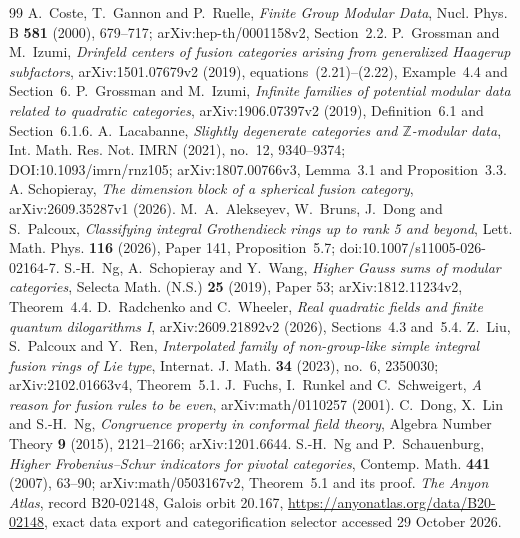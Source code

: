 \documentclass[11pt,reqno]{amsart}
\theoremstyle{definition}
\theoremstyle{remark}
\begin{document}
\begin{thebibliography}{99}
 A.~Coste, T.~Gannon and P.~Ruelle, \emph{Finite Group Modular Data}, Nucl. Phys. B \textbf{581} (2000), 679--717; arXiv:hep-th/0001158v2, Section~2.2.
 P.~Grossman and M.~Izumi, \emph{Drinfeld centers of fusion categories arising from generalized Haagerup subfactors}, arXiv:1501.07679v2 (2019), equations~(2.21)--(2.22), Example~4.4 and Section~6.
 P.~Grossman and M.~Izumi, \emph{Infinite families of potential modular data related to quadratic categories}, arXiv:1906.07397v2 (2019), Definition~6.1 and Section~6.1.6.
 A.~Lacabanne,
\emph{Slightly degenerate categories and $\mathbb Z$-modular data},
Int. Math. Res. Not. IMRN (2021), no.~12, 9340--9374;
DOI:10.1093/imrn/rnz105; arXiv:1807.00766v3, Lemma~3.1 and Proposition~3.3.
 A. Schopieray, \emph{The dimension block of a spherical fusion category}, arXiv:2609.35287v1 (2026).
 M.~A.~Alekseyev, W.~Bruns, J.~Dong and S.~Palcoux, \emph{Classifying integral Grothendieck rings up to rank 5 and beyond}, Lett. Math. Phys. \textbf{116} (2026), Paper 141, Proposition~5.7; doi:10.1007/s11005-026-02164-7.
 S.-H.~Ng, A.~Schopieray and Y.~Wang, \emph{Higher Gauss sums of modular categories}, Selecta Math. (N.S.) \textbf{25} (2019), Paper 53; arXiv:1812.11234v2, Theorem~4.4.
 D.~Radchenko and C.~Wheeler, \emph{Real quadratic fields and finite quantum dilogarithms I}, arXiv:2609.21892v2 (2026), Sections~4.3 and~5.4.
 Z.~Liu, S.~Palcoux and Y.~Ren, \emph{Interpolated family of non-group-like simple integral fusion rings of Lie type}, Internat. J. Math. \textbf{34} (2023), no.~6, 2350030; arXiv:2102.01663v4, Theorem~5.1.
 J.~Fuchs, I.~Runkel and C.~Schweigert, \emph{A reason for fusion rules to be even}, arXiv:math/0110257 (2001).
 C.~Dong, X.~Lin and S.-H.~Ng, \emph{Congruence property in conformal field theory}, Algebra Number Theory \textbf{9} (2015), 2121--2166; arXiv:1201.6644.
 S.-H.~Ng and P.~Schauenburg, \emph{Higher Frobenius--Schur indicators for pivotal categories}, Contemp. Math. \textbf{441} (2007), 63--90; arXiv:math/0503167v2, Theorem~5.1 and its proof.
\emph{The Anyon Atlas}, record B20-02148, Galois orbit 20.167,
\url{https://anyonatlas.org/data/B20-02148}, exact data export and
categorification selector accessed 29 October 2026.
\end{thebibliography}
\end{document}
